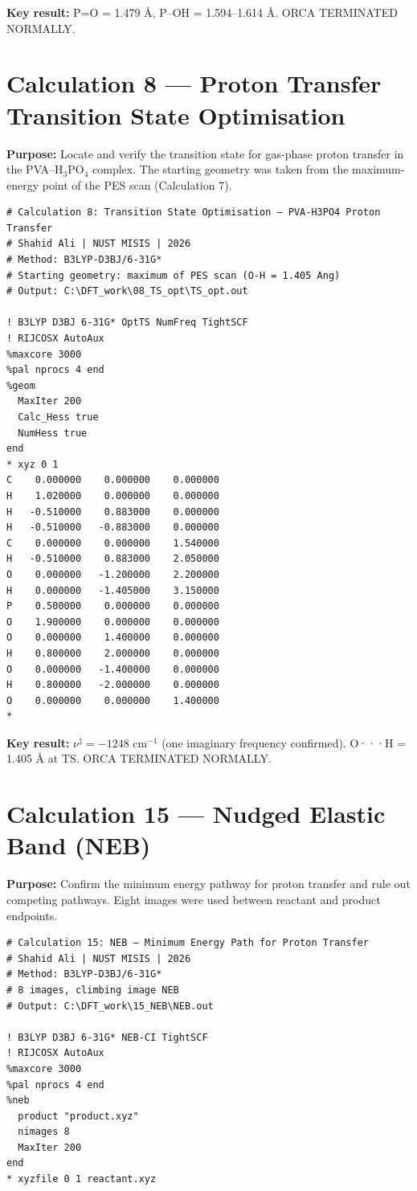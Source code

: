\documentclass[12pt,a4paper]{report}
\begin{document}
\textbf{Key result:} P=O = 1.479 Å, P–OH = 1.594–1.614 Å. ORCA TERMINATED NORMALLY.

\section{Calculation 8 — Proton Transfer Transition State Optimisation}

\textbf{Purpose:} Locate and verify the transition state for gas-phase proton transfer in the PVA–H\(_3\)PO\(_4\) complex. The starting geometry was taken from the maximum-energy point of the PES scan (Calculation 7).

\begin{verbatim}
# Calculation 8: Transition State Optimisation — PVA-H3PO4 Proton Transfer
# Shahid Ali | NUST MISIS | 2026
# Method: B3LYP-D3BJ/6-31G*
# Starting geometry: maximum of PES scan (O-H = 1.405 Ang)
# Output: C:\DFT_work\08_TS_opt\TS_opt.out

! B3LYP D3BJ 6-31G* OptTS NumFreq TightSCF
! RIJCOSX AutoAux
%maxcore 3000
%pal nprocs 4 end
%geom
  MaxIter 200
  Calc_Hess true
  NumHess true
end
* xyz 0 1
C    0.000000    0.000000    0.000000
H    1.020000    0.000000    0.000000
H   -0.510000    0.883000    0.000000
H   -0.510000   -0.883000    0.000000
C    0.000000    0.000000    1.540000
H   -0.510000    0.883000    2.050000
O    0.000000   -1.200000    2.200000
H    0.000000   -1.405000    3.150000
P    0.500000    0.000000    0.000000
O    1.900000    0.000000    0.000000
O    0.000000    1.400000    0.000000
H    0.800000    2.000000    0.000000
O    0.000000   -1.400000    0.000000
H    0.800000   -2.000000    0.000000
O    0.000000    0.000000    1.400000
*
\end{verbatim}

\textbf{Key result:} \(\nu^{\ddagger} = -1248\) cm\(^{-1}\) (one imaginary frequency confirmed). O···H = 1.405 Å at TS. ORCA TERMINATED NORMALLY.

\section{Calculation 15 — Nudged Elastic Band (NEB)}

\textbf{Purpose:} Confirm the minimum energy pathway for proton transfer and rule out competing pathways. Eight images were used between reactant and product endpoints.

\begin{verbatim}
# Calculation 15: NEB — Minimum Energy Path for Proton Transfer
# Shahid Ali | NUST MISIS | 2026
# Method: B3LYP-D3BJ/6-31G*
# 8 images, climbing image NEB
# Output: C:\DFT_work\15_NEB\NEB.out

! B3LYP D3BJ 6-31G* NEB-CI TightSCF
! RIJCOSX AutoAux
%maxcore 3000
%pal nprocs 4 end
%neb
  product "product.xyz"
  nimages 8
  MaxIter 200
end
* xyzfile 0 1 reactant.xyz
\end{verbatim}
\end{document}
